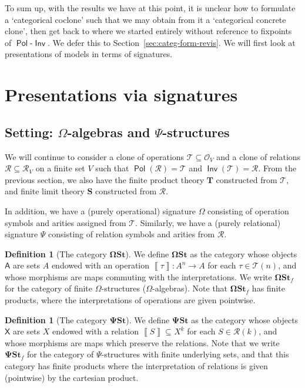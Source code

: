 \documentclass[11pt, a4paper, twoside,leqno]{amsart}
\newcommand{\cat}[1]{\mathbf{#1}}
\newcommand{\dbr}[1]{\left\llbracket{#1}\right\rrbracket}
\renewcommand{\O}{{\mathcal O}}
\newcommand{\R}{{\mathcal R}}
\numberwithin{equation}{section}
\theoremstyle{plain}
\theoremstyle{definition}
\newtheorem{Defn}[Thm]{Definition}
\DeclareMathOperator{\Pol}{\mathsf{Pol}}
\DeclareMathOperator{\Inv}{\mathsf{Inv}}
\begin{document}
To sum up, with the results we have at this point, it is unclear how to formulate
a `categorical coclone' such that we may obtain from it a
`categorical concrete clone', then get back to where we started entirely without reference to fixpoints of
\(\Pol\)-\(\Inv\). We defer this to
Section~\ref{sec:categ-form-revis}. We will first look at
presentations of models in terms of signatures.


\section{Presentations via signatures}
\label{sec:via-sig-structures}


\subsection{Setting: \(\Omega\)-algebras and \(\Psi\)-structures}
\label{sec:sig-setting}


We will continue to consider a clone of operations \(\mathscr{T}
\subseteq \O_{V}\) and a clone of
relations \(\mathscr{R}
\subseteq \R_{V}\) on a finite set \(V\) such that  \(\Pol(\mathscr{R}
) = \mathscr{T}
\) and \(\Inv(\mathscr{T}
) = \mathscr{R}
\). From the previous section, we also have the finite product theory
\(\cat{T}\) constructed from \(\mathscr{T}
\), and finite limit theory \(\cat{S}\) constructed from \(\mathscr{R}\).

In addition, we have a (purely operational) signature \(\Omega\) consisting of
operation symbols and arities assigned from \(\mathscr{T}
\). Similarly, we have a (purely relational) signature \(\Psi\) consisting of
relation symbols and arities from \(\mathscr{R}
\). 

\begin{Defn}[The category \(\cat{\Omega St}\)]
  \label{def:Om-str}
  We define $\cat{\Omega St}$ as the category whose objects \(\mathsf{A}\) are
  sets \(A\) endowed with an operation
  \(\dbr{\tau} \colon A^{n} \rightarrow A\) for each \(\tau\in \mathscr{T}(n)\), and whose
  morphisms are maps commuting with the interpretations. We write
  \(\cat{\Omega St}_{f}\) for the category of finite
  \(\Omega\)-structures (\(\Omega\)-algebras). Note that \(\cat{\Omega St}_{f}\)
  has finite products, where the interpretations of operations are
  given pointwise.
\end{Defn}

\begin{Defn}[The category \(\cat{\Psi St}\)]
  \label{def:psi-str}
  We define \(\cat{\Psi St}\) as the category whose objects \(\mathsf{X}\) are
  sets \(X\) endowed with a relation \(\dbr{S} \subseteq X^{k}\) for each
  \(S\in \mathscr{R}(k)
  \), and whose morphisms are maps which preserve the
  relations. Note that we write \(\cat{\Psi St}_{f}\) for the category
  of \(\Psi\)-structures with finite underlying sets, and that this
  category has finite products where the
  interpretation of relations is given (pointwise) by the cartesian product.
\end{Defn}
\end{document}
